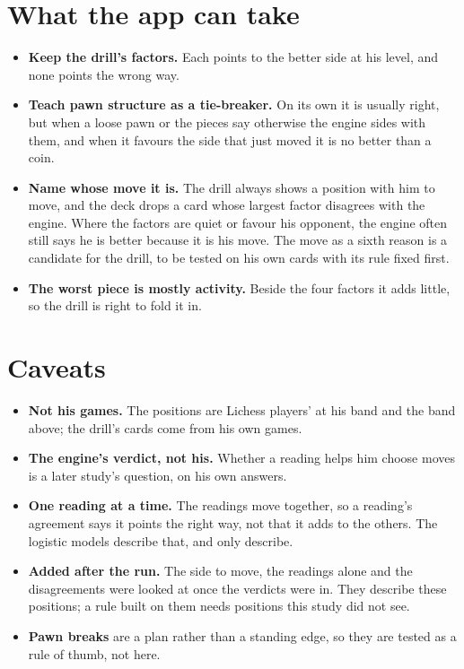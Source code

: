 \documentclass[11pt]{article}
\begin{document}
\section{What the app can take}

\begin{itemize}[nosep]
\item \textbf{Keep the drill's factors.} Each points to the better side at his level, and none
  points the wrong way.
\item \textbf{Teach pawn structure as a tie-breaker.} On its own it is usually right, but when a
  loose pawn or the pieces say otherwise the engine sides with them, and when it favours the side
  that just moved it is no better than a coin.
\item \textbf{Name whose move it is.} The drill always shows a position with him to move, and the
  deck drops a card whose largest factor disagrees with the engine. Where the factors are quiet
  or favour his opponent, the engine often still says he is better because it is his move. The
  move as a sixth reason is a candidate for the drill, to be tested on his own cards with its
  rule fixed first.
\item \textbf{The worst piece is mostly activity.} Beside the four factors it adds little, so the
  drill is right to fold it in.
\end{itemize}

\section{Caveats}

\begin{itemize}[nosep]
\item \textbf{Not his games.} The positions are Lichess players' at his band and the band above;
  the drill's cards come from his own games.
\item \textbf{The engine's verdict, not his.} Whether a reading helps him choose moves is a later
  study's question, on his own answers.
\item \textbf{One reading at a time.} The readings move together, so a reading's agreement says it
  points the right way, not that it adds to the others. The logistic models describe that, and
  only describe.
\item \textbf{Added after the run.} The side to move, the readings alone and the disagreements
  were looked at once the verdicts were in. They describe these positions; a rule built on them
  needs positions this study did not see.
\item \textbf{Pawn breaks} are a plan rather than a standing edge, so they are tested as a rule of
  thumb, not here.
\end{itemize}
\end{document}
